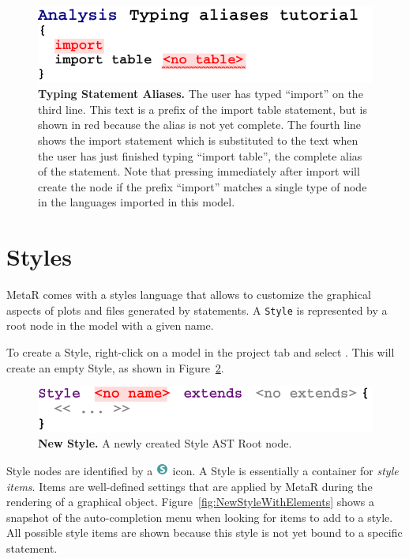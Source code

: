 \begin{figure}[h!tbp]
  \centering
  \includegraphics[width=\figWidthNarrow]{figures/AnalysisTypingAliases.pdf}
\caption[Typing Statement Aliases.]{\textbf{Typing Statement Aliases.} The user has typed ``import'' on the third line. This text is a prefix of the import table statement, but is shown in red because the alias is not yet complete. The fourth line shows the import statement which is substituted to the text when the user has just finished typing ``import table'', the complete alias of the statement. Note that pressing \keys{\return} immediately after import will create the node if the prefix ``import'' matches a single type of node in the languages imported in this model.}
\label{fig:TypingStatementAliases}
\end{figure}

\section{Styles} \label{styles}

MetaR comes with a styles language that allows to customize the graphical aspects of plots and files generated by statements. A \texttt{Style} is represented by a root node in the model with a given name. 

To create a Style, right-click on a model in the project tab and select . This will create an empty Style, as shown in Figure~\ref{fig:NewStyle}. 

\begin{figure}[h!tbp]
  \centering
  \includegraphics[width=\figWidthNarrow]{figures/NewStyle.pdf}
\caption[New Style.]{\textbf{New Style.} A newly created Style AST Root node.}
\label{fig:NewStyle}
\end{figure}

Style nodes are identified by a \includegraphics[height=2ex]{figures/style.png} icon. A Style is essentially a container for \textit{style items}. Items are well-defined settings that are applied by MetaR during the rendering of a graphical object.  Figure~\ref{fig:NewStyleWithElements} shows a snapshot of the auto-completion menu when looking for items to add to a style. All possible style items are shown because this style is not yet bound to a specific statement.

